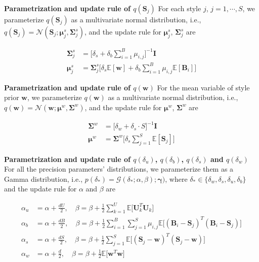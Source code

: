 \noindent \textbf{Parametrization and update rule of $q(\mathbf{S}_j)$}
For each style $j$, $j = 1, \cdots, S$, we parameterize $q(\mathbf{S}_j)$ as a multivariate normal distribution, i.e., $q(\mathbf{S}_j) = \mathcal{N}(\mathbf{S}_j; \bm{\mu}^s_j, \bm{\Sigma}^s_j)$, and the update rule for $\bm{\mu}^s_j$, $\bm{\Sigma}^s_j$ are 

\begin{align}
\bm{\Sigma}^s_j & = \big[\delta_s+\delta_b\sum_{i=1}^{B}\mu_{i,j}\big]^{-1}\mathbf{I} \\ 
\bm{\mu}^s_j & = \bm{\Sigma}_j^{s}\Big[ \delta_s\mathbb{E}[\bm{w}]+\delta_b\sum_{i=1}^B\mu_{i,j}\mathbb{E}[\mathbf{B}_i] \Big]
\end{align}


\noindent \textbf{Parametrization and update rule of $q(\mathbf{w})$}
For the mean variable of style prior $\mathbf{w}$, we parameterize $q(\mathbf{w})$ as a multivariate normal distribution, i.e., $q(\mathbf{w}) = \mathcal{N}(\mathbf{w}; \bm{\mu}^w, \bm{\Sigma}^w)$, and the update rule for $\bm{\mu}^w$, $\bm{\Sigma}^w$ are 

\begin{align}
\bm{\Sigma}^w & = \big[\delta_w+\delta_s\cdot S\big]^{-1}\mathbf{I}\\ 
\bm{\mu}^w & = \bm{\Sigma}^w\Big[ \delta_s\sum_{j=1}^S\mathbb{E}[\mathbf{S}_j] \Big]
\end{align}



\noindent \textbf{Parametrization and update rule of $q(\delta_u)$, $q(\delta_b)$, $q(\delta_s)$ and $q(\delta_w)$}
For all the precision parameters' distributions, we parameterize them as a Gamma distribution, i.e., $p(\delta_*) = \mathcal{G}(\delta_*; \alpha, \beta); \mathbf{\gamma})$, where $\delta_* \in \{ \delta_w, \delta_s, \delta_u, \delta_b \}$ and the update rule for $\alpha$ and $\beta$ are 

\begin{align}
\alpha_u & = \alpha + \frac{dU}{2},\quad  \beta=\beta+\frac{1}{2}\sum_{k=1}^{U}\mathbb{E}\big[\mathbf{U}_k^T\mathbf{U}_k\big] \\ 
\alpha_b & = \alpha + \frac{dB}{2},\quad  \beta=\beta+\frac{1}{2}\sum_{i=1}^{B}\sum_{j=1}^{S}\mu_{i,j}\mathbb{E}\big[(\mathbf{B}_i-\mathbf{S}_j)^T(\mathbf{B}_i-\mathbf{S}_j)\big] \\
\alpha_s & = \alpha + \frac{dS}{2},\quad  \beta=\beta+\frac{1}{2}\sum_{j=1}^{S}\mathbb{E}\big[(\mathbf{S}_j-\mathbf{w})^T(\mathbf{S}_j-\mathbf{w})\big] \\
\alpha_w & = \alpha + \frac{d}{2},\quad  \beta=\beta+\frac{1}{2}\mathbb{E}\big[\mathbf{w}^T\mathbf{w}\big] \\
\end{align}


